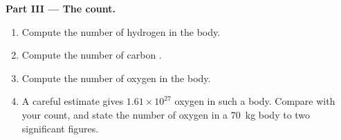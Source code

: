 \begin{problem}
\medskip
\noindent\textbf{Part III --- The count.}
\begin{enumerate}[resume]
  \item Compute the number of hydrogen  in the body.
  \item Compute the number of carbon .
  \item Compute the number of oxygen  in the body.
  \item A careful estimate gives $1.61 \times 10^{27}$ oxygen  in such
        a body. Compare with your count, and state the number of oxygen
         in a \qty{70}{kg} body to two significant figures.
\end{enumerate}
\end{problem}
